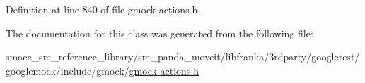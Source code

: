 Definition at line 840 of file gmock-\/actions.\+h.



The documentation for this class was generated from the following file\+:\begin{DoxyCompactItemize}
\item 
smacc\+\_\+sm\+\_\+reference\+\_\+library/sm\+\_\+panda\+\_\+moveit/libfranka/3rdparty/googletest/googlemock/include/gmock/\hyperlink{gmock-actions_8h}{gmock-\/actions.\+h}\end{DoxyCompactItemize}
